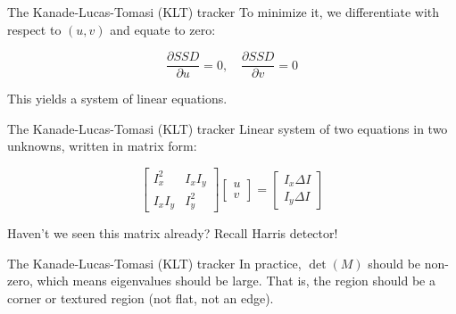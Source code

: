 \begin{frame}{The Kanade-Lucas-Tomasi (KLT) tracker}
  To minimize it, we differentiate with respect to $(u,v)$ and equate to zero:
  
  \[
  \frac{\partial SSD}{\partial u} = 0, \quad \frac{\partial SSD}{\partial v} = 0
  \]
  
  This yields a system of linear equations.
\end{frame}

\begin{frame}{The Kanade-Lucas-Tomasi (KLT) tracker}
  Linear system of two equations in two unknowns, written in matrix form:
  
  \[
  \begin{bmatrix}
    I_x^2 & I_x I_y \\
    I_x I_y & I_y^2
  \end{bmatrix}
  \begin{bmatrix}
    u \\ v
  \end{bmatrix}
  =
  \begin{bmatrix}
    I_x \Delta I \\ I_y \Delta I
  \end{bmatrix}
  \]
  
  Haven’t we seen this matrix already? Recall Harris detector!
\end{frame}

\begin{frame}{The Kanade-Lucas-Tomasi (KLT) tracker}
  In practice, $\det(M)$ should be non-zero, which means eigenvalues should be large.  
  That is, the region should be a corner or textured region (not flat, not an edge).
  
\end{frame}


